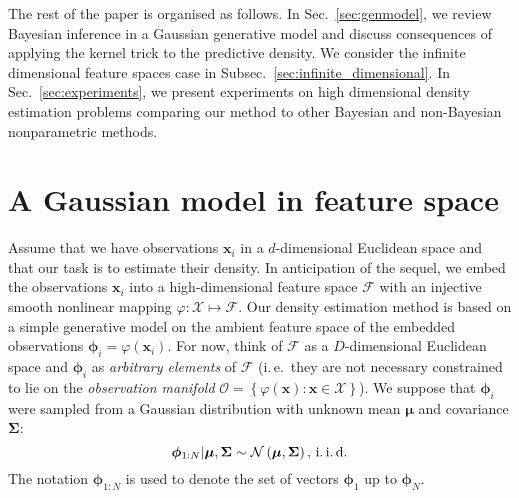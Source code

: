 \documentclass[twoside]{article}
\newcommand{\transpose}[1]{#1^{\mbox{\sf \scriptsize T}}}
\newcommand{\ie}{i.\,e.\ }
\begin{document}
The rest of the paper is organised as follows. In Sec.~\ref{sec:genmodel}, we review Bayesian inference in a Gaussian generative model and discuss consequences of applying the kernel trick to the predictive density. We consider the infinite dimensional feature spaces case in Subsec.~\ref{sec:infinite_dimensional}. In Sec.~\ref{sec:experiments}, we present experiments on high dimensional density estimation problems comparing our method to other Bayesian and non-Bayesian nonparametric methods.

\section{A Gaussian model in feature space\label{sec:genmodel}}

Assume that we have observations $\bm{x}_i$ in a $d$-dimensional Euclidean space and that our task is to estimate their density. In anticipation of the sequel, we embed the observations $\bm{x}_i$ into a high-dimensional feature space $\mathcal{F}$ with an injective smooth nonlinear mapping ${\varphi:\mathcal{X} \mapsto \mathcal{F}}$. Our density estimation method is based on a simple generative model on the ambient feature space of the embedded observations $\bm{\phi}_i=\varphi(\bm{x}_i)$. For now, think of $\mathcal{F}$ as a $D$-dimensional Euclidean space and $\bm{\phi}_i$ as \emph{arbitrary elements} of $\mathcal{F}$ (\ie they are not necessary constrained to lie on the \emph{observation manifold} $\mathcal{O} = \left\{\varphi(\bm{x}) : \bm{x}\in\mathcal{X}\right\}$). We suppose that $\bm{\phi}_i$ were sampled from a Gaussian distribution with unknown mean $\bm{\mu}$ and covariance $\bm{\Sigma}$:
\begin{equation}
 \bm{\phi}_{1:N}\vert \bm{\mu},\bm{\Sigma} \sim \mathcal{N}\left(\bm{\mu},\bm{\Sigma}\right)\mbox{, i.\,i.\,d.}\label{eqn:genmodel_obs}
\end{equation}
The notation $\bm{\phi}_{1:N}$ is used to denote the set of vectors $\bm{\phi}_{1}$ up to $\bm{\phi}_{N}$.

\end{document}
